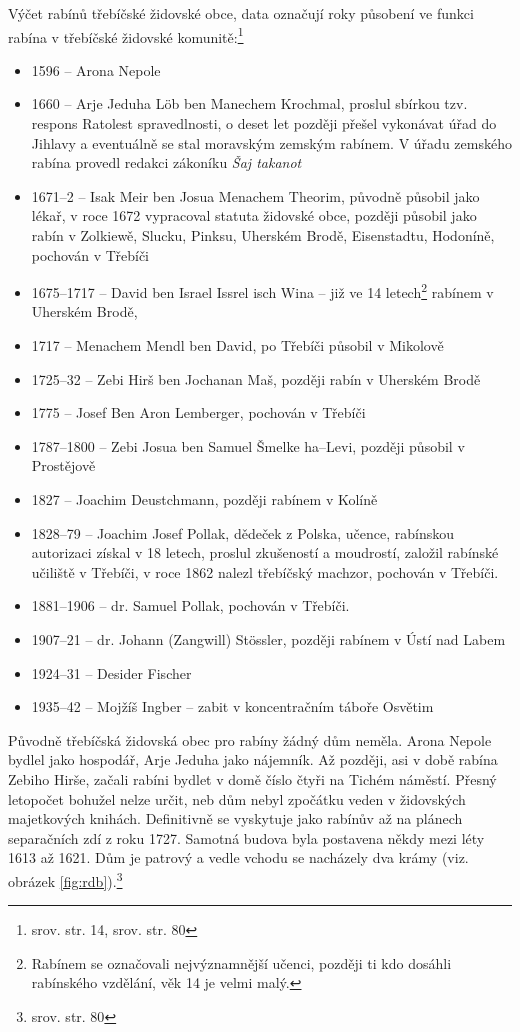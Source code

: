\documentclass[a4paper,oneside,12pt]{report}
\begin{document}
\vspace{0.25cm}
\noindent
Výčet rabínů třebíčské židovské obce, data označují roky působení ve funkci rabína v třebíčské židovské komunitě:\footnote{srov. \cite{Klenovsky2003} str. 14, srov. \cite{Fiser2005} str. 80}
\begin{itemize}
	\item 1596 -- Arona Nepole
	\item 1660 -- Arje Jeduha Löb ben Manechem Krochmal, proslul sbírkou tzv. respons Ratolest spravedlnosti, o deset let později přešel vykonávat úřad do Jihlavy a eventuálně se stal moravským zemským rabínem. V úřadu zemského rabína provedl redakci zákoníku \textit{Šaj takanot}
	\item 1671--2 -- Isak Meir ben Josua Menachem Theorim, původně působil jako lékař, v roce 1672 vypracoval statuta židovské obce, později působil jako rabín v Zolkiewě, Slucku, Pinksu, Uherském Brodě, Eisenstadtu, Hodoníně, pochován v Třebíči
	\item 1675--1717 -- David ben Israel Issrel isch Wina -- již ve 14 letech\footnote{Rabínem se označovali nejvýznamnější učenci, později ti kdo dosáhli rabínského vzdělání, věk 14 je velmi malý.} rabínem v Uherském Brodě,
	\item 1717 -- Menachem Mendl ben David, po Třebíči působil v Mikolově
	\item 1725--32 -- Zebi Hirš ben Jochanan Maš, později rabín v Uherském Brodě
	\item 1775 -- Josef Ben Aron Lemberger, pochován v Třebíči
	\item 1787--1800 -- Zebi Josua ben Samuel Šmelke ha--Levi, později působil v Prostějově
	\item 1827 -- Joachim Deustchmann, později rabínem v Kolíně
	\item 1828--79 -- Joachim Josef Pollak, dědeček z Polska, učence, rabínskou autorizaci získal v 18 letech, proslul zkušeností a moudrostí, založil rabínské učiliště v Třebíči, v roce 1862 nalezl třebíčský machzor, pochován v Třebíči.
	\item 1881--1906 -- dr. Samuel Pollak, pochován v Třebíči.
	\item 1907--21 -- dr. Johann (Zangwill) Stössler, později rabínem v Ústí nad Labem
	\item 1924--31 -- Desider Fischer
	\item 1935--42 -- Mojžíš Ingber -- zabit v koncentračním táboře Osvětim
\end{itemize}

Původně třebíčská židovská obec pro rabíny žádný dům neměla.
Arona Nepole bydlel jako hospodář, Arje Jeduha jako nájemník.
Až později, asi v době rabína Zebiho Hirše, začali rabíni bydlet v domě číslo čtyři na Tichém náměstí.
Přesný letopočet bohužel nelze určit, neb dům nebyl zpočátku veden v židovských majetkových knihách.
Definitivně se vyskytuje jako rabínův až na plánech separačních zdí z roku 1727.
Samotná budova byla postavena někdy mezi léty 1613 až 1621.
Dům je patrový a vedle vchodu se nacházely dva krámy (viz. obrázek \ref{fig:rdb}).\footnote{srov. \cite{Fiser2005} str. 80}
\end{document}
